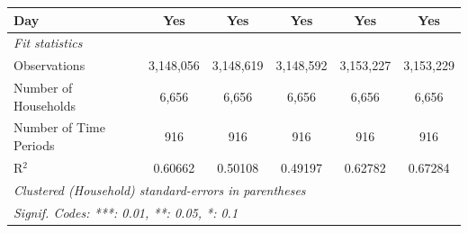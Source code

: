\begin{table}[htbp]
\begin{tabular}{lccccc}
      Day                                     & Yes              & Yes                & Yes             & Yes             & Yes\\  
      \midrule
      \emph{Fit statistics}\\
      Observations                            & 3,148,056        & 3,148,619          & 3,148,592       & 3,153,227       & 3,153,229\\  
      Number of Households          & 6,656            & 6,656              & 6,656           & 6,656           & 6,656\\  
      Number of Time Periods                  & 916              & 916                & 916             & 916             & 916\\  
      R$^2$                                   & 0.60662          & 0.50108            & 0.49197         & 0.62782         & 0.67284\\  
      \midrule \midrule
      \multicolumn{6}{l}{\emph{Clustered (Household) standard-errors in parentheses}}\\
      \multicolumn{6}{l}{\emph{Signif. Codes: ***: 0.01, **: 0.05, *: 0.1}}\\
   \end{tabular}
\end{table}


